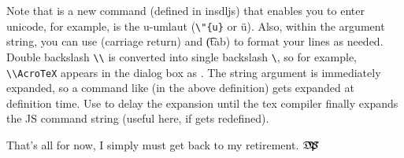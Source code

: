 \documentclass{article}
\let\pkg\textsf
\def\AcroTeX{Acro\!\TeX}
\def\dps{$\mbox{$\mathfrak D$\kern-.3em\mbox{$\mathfrak P$}%
   \kern-.6em \hbox{$\mathcal S$}}$}
\def\dps{$\hbox{$\mathfrak D$\kern-.3em\hbox{$\mathfrak P$}%
   \kern-.6em \hbox{$\mathcal S$}}$}
\begin{document}
\newtopic Note that  is a new command (defined in \pkg{insdljs}) that enables you
to enter unicode, for example,  is the u-umlaut (\verb!\"{u}! or
\"{u}). Also, within the argument string, you can use  (carriage
return) and \t (tab) to format your lines as needed. Double backslash
\verb!\\! is converted into single backslash \verb!\!, so for example,
\verb!\\AcroTeX! appears in the dialog box as . The string
argument is immediately expanded, so a command like  (in the above
definition) gets expanded at definition time. Use  to delay the
expansion until the tex compiler finally expands the JS command string
(useful here, if  gets redefined).



\bigskip\noindent
That's all for now, I simply must get back to my retirement. \dps
\end{document}
